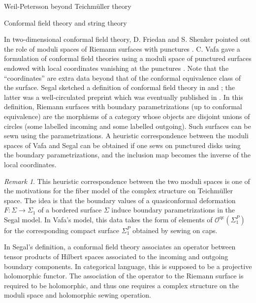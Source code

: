 \documentclass[12pt]{amsart}
\newcommand{\riem}{\Sigma}  %
\theoremstyle{plain}
\theoremstyle{definition}
\theoremstyle{remark}
\newtheorem{remark}[theorem]{Remark}
\numberwithin{equation}{section} %
\numberwithin{figure}{section} %
\begin{document}
\begin{section}{Weil-Petersson beyond Teichm\"uller theory} \label{se:in_the_wild} 
\begin{subsection}{Conformal field theory and string theory}   \label{se:conformal_field_theory}





  In two-dimensional conformal field theory, D. Friedan and S. Shenker pointed out the role of moduli spaces of Riemann surfaces with punctures \cite{FriedanShenker}. C. Vafa gave a formulation of conformal field theories using a moduli space of punctured surfaces endowed with local coordinates vanishing at the punctures \cite{Vafa}.  Note that the ``coordinates'' are extra data beyond that of the conformal equivalence class of the surface. 
  Segal sketched a definition of conformal field theory in \cite{Segal87} and \cite{SegalPreprint}; the latter was a well-circulated preprint which was eventually published in \cite{SegalPublished}. In this definition, Riemann surfaces with boundary parametrizations (up to conformal equivalence) are the morphisms of a category whose objects are disjoint unions of circles (some labelled incoming and some labelled outgoing). Such surfaces can be sewn using the parametrizations.  A heuristic correspondence between the moduli spaces of Vafa and Segal can be obtained if one sews on punctured disks using the boundary parametrizations, and the inclusion map becomes the inverse of the local coordinates.  
\begin{remark}
    This heuristic correspondence between the two moduli spaces is one of the motivations for the fiber model of the complex structure on Teichm\"uller space. The idea is that the boundary values of a quasiconformal deformation $F:\riem \rightarrow \riem_1$ of a bordered surface $\riem$ induce boundary parametrizations in the Segal model. In Vafa's model, this data takes the form of elements of $\mathcal{O}^{\mathrm{qc}}(\riem_1^P)$ for the corresponding compact surface $\riem^P_1$ obtained by sewing on caps.
\end{remark}
  
  In Segal's definition, a conformal field theory associates an operator between tensor products of Hilbert spaces associated to the incoming and outgoing boundary components. In categorical language, this is supposed to be a projective holomorphic functor. The association of the operator to the Riemann surface is required to be holomorphic, and thus one requires a complex structure on the moduli space and holomorphic sewing operation.  


\end{subsection}
\end{section}
\end{document}
